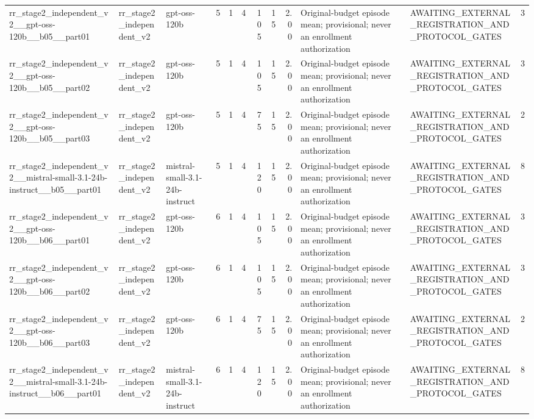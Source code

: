 \begin{tabular}{lllrrrrrrllr}
rr\_stage2\_independent\_v2\_\_gpt-oss-120b\_\_b05\_\_part01 & rr\_stage2\_independent\_v2 & gpt-oss-120b & 5 & 1 & 4 & 105 & 15 & 2.00 & Original-budget episode mean; provisional; never an enrollment authorization & AWAITING\_EXTERNAL\_REGISTRATION\_AND\_PROTOCOL\_GATES & 3 \\
rr\_stage2\_independent\_v2\_\_gpt-oss-120b\_\_b05\_\_part02 & rr\_stage2\_independent\_v2 & gpt-oss-120b & 5 & 1 & 4 & 105 & 15 & 2.00 & Original-budget episode mean; provisional; never an enrollment authorization & AWAITING\_EXTERNAL\_REGISTRATION\_AND\_PROTOCOL\_GATES & 3 \\
rr\_stage2\_independent\_v2\_\_gpt-oss-120b\_\_b05\_\_part03 & rr\_stage2\_independent\_v2 & gpt-oss-120b & 5 & 1 & 4 & 75 & 15 & 2.00 & Original-budget episode mean; provisional; never an enrollment authorization & AWAITING\_EXTERNAL\_REGISTRATION\_AND\_PROTOCOL\_GATES & 2 \\
rr\_stage2\_independent\_v2\_\_mistral-small-3.1-24b-instruct\_\_b05\_\_part01 & rr\_stage2\_independent\_v2 & mistral-small-3.1-24b-instruct & 5 & 1 & 4 & 120 & 15 & 2.00 & Original-budget episode mean; provisional; never an enrollment authorization & AWAITING\_EXTERNAL\_REGISTRATION\_AND\_PROTOCOL\_GATES & 8 \\
rr\_stage2\_independent\_v2\_\_gpt-oss-120b\_\_b06\_\_part01 & rr\_stage2\_independent\_v2 & gpt-oss-120b & 6 & 1 & 4 & 105 & 15 & 2.00 & Original-budget episode mean; provisional; never an enrollment authorization & AWAITING\_EXTERNAL\_REGISTRATION\_AND\_PROTOCOL\_GATES & 3 \\
rr\_stage2\_independent\_v2\_\_gpt-oss-120b\_\_b06\_\_part02 & rr\_stage2\_independent\_v2 & gpt-oss-120b & 6 & 1 & 4 & 105 & 15 & 2.00 & Original-budget episode mean; provisional; never an enrollment authorization & AWAITING\_EXTERNAL\_REGISTRATION\_AND\_PROTOCOL\_GATES & 3 \\
rr\_stage2\_independent\_v2\_\_gpt-oss-120b\_\_b06\_\_part03 & rr\_stage2\_independent\_v2 & gpt-oss-120b & 6 & 1 & 4 & 75 & 15 & 2.00 & Original-budget episode mean; provisional; never an enrollment authorization & AWAITING\_EXTERNAL\_REGISTRATION\_AND\_PROTOCOL\_GATES & 2 \\
rr\_stage2\_independent\_v2\_\_mistral-small-3.1-24b-instruct\_\_b06\_\_part01 & rr\_stage2\_independent\_v2 & mistral-small-3.1-24b-instruct & 6 & 1 & 4 & 120 & 15 & 2.00 & Original-budget episode mean; provisional; never an enrollment authorization & AWAITING\_EXTERNAL\_REGISTRATION\_AND\_PROTOCOL\_GATES & 8 \\

\end{tabular}
